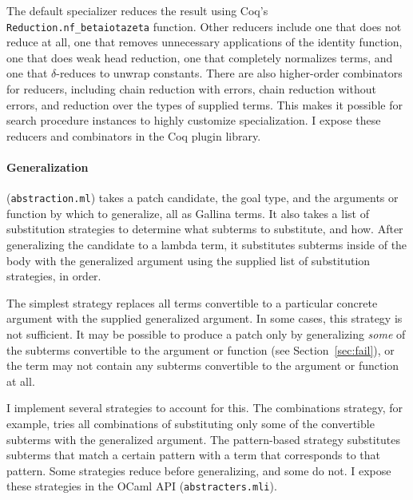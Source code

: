 The default specializer reduces the result using Coq's
\lstinline{Reduction.nf_betaiotazeta} function.
Other reducers include one that does not reduce at all, one that removes unnecessary applications of the identity function, 
one that does weak head reduction, one that completely normalizes terms, %
and one that $\delta$-reduces to unwrap constants.
There are also higher-order combinators for reducers,
including chain reduction with errors, chain reduction without errors, and reduction over the types of supplied terms.
This makes it possible for search procedure instances to highly customize specialization.
I expose these reducers and combinators in the Coq plugin library. %

\paragraph{Generalization}  (\lstinline{abstraction.ml}) %
takes a patch candidate, the goal type, and the arguments or function by which to generalize,
all as Gallina terms.
It also takes a list of substitution strategies to determine what subterms to substitute, and how.
After generalizing the candidate to a lambda term, it substitutes subterms inside of the body with the generalized argument
using the supplied list of substitution strategies, in order.

The simplest strategy replaces all terms convertible to a particular concrete argument %
with the supplied generalized argument.
In some cases, this strategy is not sufficient.
It may be possible to produce a patch only by generalizing \emph{some} of the subterms
convertible to the argument or function (see Section~\ref{sec:fail}),
or the term may not contain any subterms convertible to the argument or function at all.

I implement several strategies to account for this. The combinations strategy, for example,
tries all combinations of substituting only some of the convertible subterms with the generalized argument. 
The pattern-based strategy substitutes subterms that match a certain pattern
with a term that corresponds to that pattern.
Some strategies reduce before generalizing, and some do not.
I expose these strategies in the \sysname OCaml API (\lstinline{abstracters.mli}). %

